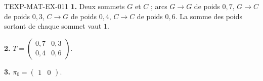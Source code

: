 \begin{corrige}{TEXP-MAT-EX-011}
\textbf{1.} Deux sommets $G$ et $C$ ; arcs $G\to G$ de poids $0{,}7$,
$G\to C$ de poids $0{,}3$, $C\to G$ de poids $0{,}4$, $C\to C$ de poids
$0{,}6$. La somme des poids sortant de chaque sommet vaut $1$.

\textbf{2.} $T=\begin{pmatrix}0{,}7&0{,}3\\0{,}4&0{,}6\end{pmatrix}$.

\textbf{3.} $\pi_0=\begin{pmatrix}1&0\end{pmatrix}$.
\end{corrige}
